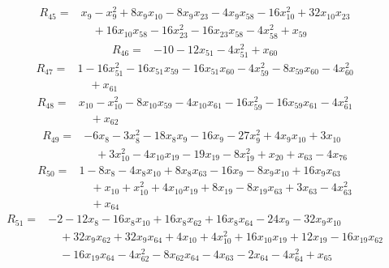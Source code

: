\begin{equation*}\begin{split}
R_{45}={}&x_{9} - x_{9}^{2} + 8x_{9} x_{10} - 8x_{9} x_{23} - 4x_{9} x_{58} - 16x_{10}^{2} + 32x_{10} x_{23}\\
&\quad + 16x_{10} x_{58} - 16x_{23}^{2} - 16x_{23} x_{58} - 4x_{58}^{2} + x_{59}
\end{split}\end{equation*}
\begin{equation*}\begin{split}
R_{46}={}&-10 - 12x_{51} - 4x_{51}^{2} + x_{60}
\end{split}\end{equation*}
\begin{equation*}\begin{split}
R_{47}={}&1 - 16x_{51}^{2} - 16x_{51} x_{59} - 16x_{51} x_{60} - 4x_{59}^{2} - 8x_{59} x_{60} - 4x_{60}^{2}\\
&\quad + x_{61}
\end{split}\end{equation*}
\begin{equation*}\begin{split}
R_{48}={}&x_{10} - x_{10}^{2} - 8x_{10} x_{59} - 4x_{10} x_{61} - 16x_{59}^{2} - 16x_{59} x_{61} - 4x_{61}^{2}\\
&\quad + x_{62}
\end{split}\end{equation*}
\begin{equation*}\begin{split}
R_{49}={}&-6x_{8} - 3x_{8}^{2} - 18x_{8} x_{9} - 16x_{9} - 27x_{9}^{2} + 4x_{9} x_{10} + 3x_{10}\\
&\quad + 3x_{10}^{2} - 4x_{10} x_{19} - 19x_{19} - 8x_{19}^{2} + x_{20} + x_{63} - 4x_{76}
\end{split}\end{equation*}
\begin{equation*}\begin{split}
R_{50}={}&1 - 8x_{8} - 4x_{8} x_{10} + 8x_{8} x_{63} - 16x_{9} - 8x_{9} x_{10} + 16x_{9} x_{63}\\
&\quad + x_{10} + x_{10}^{2} + 4x_{10} x_{19} + 8x_{19} - 8x_{19} x_{63} + 3x_{63} - 4x_{63}^{2}\\
&\quad + x_{64}
\end{split}\end{equation*}
\begin{equation*}\begin{split}
R_{51}={}&-2 - 12x_{8} - 16x_{8} x_{10} + 16x_{8} x_{62} + 16x_{8} x_{64} - 24x_{9} - 32x_{9} x_{10}\\
&\quad + 32x_{9} x_{62} + 32x_{9} x_{64} + 4x_{10} + 4x_{10}^{2} + 16x_{10} x_{19} + 12x_{19} - 16x_{19} x_{62}\\
&\quad -16x_{19} x_{64} - 4x_{62}^{2} - 8x_{62} x_{64} - 4x_{63} - 2x_{64} - 4x_{64}^{2} + x_{65}
\end{split}\end{equation*}

